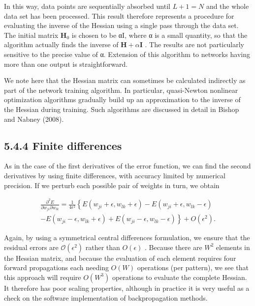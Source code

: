 \documentclass[
  10
]{article}
\begin{document}
In this way, data points are sequentially absorbed until \(L + 1 = N\)
and the whole data set has been processed. This result therefore
represents a procedure for evaluating the inverse of the Hessian using a
single pass through the data set. The initial matrix
\(\mathbf { H } _ { 0 }\) is chosen to be αI, where α is a small
quantity, so that the algorithm actually finds the inverse of
\(\mathbf H + \alpha \mathbf I\) . The results are not particularly
sensitive to the precise value of α. Extension of this algorithm to
networks having more than one output is straightforward.

We note here that the Hessian matrix can sometimes be calculated
indirectly as part of the network training algorithm. In particular,
quasi-Newton nonlinear optimization algorithms gradually build up an
approximation to the inverse of the Hessian during training. Such
algorithms are discussed in detail in Bishop and Nabney (2008).

\subsection{5.4.4 Finite differences}\label{finite-differences}

As in the case of the first derivatives of the error function, we can
find the second derivatives by using finite differences, with accuracy
limited by numerical precision. If we perturb each possible pair of
weights in turn, we obtain

\[
\begin{array}{c} \frac {\partial^ {2} E}{\partial w _ {j i} \partial w _ {l k}} = \frac {1}{4 \epsilon^ {2}} \left\{E (w _ {j i} + \epsilon , w _ {l k} + \epsilon) - E (w _ {j i} + \epsilon , w _ {l k} - \epsilon) \right. \\ \left. - E (w _ {j i} - \epsilon , w _ {l k} + \epsilon) + E (w _ {j i} - \epsilon , w _ {l k} - \epsilon) \right\} + O (\epsilon^ {2}). \end{array}\tag{5.90}
\]

Again, by using a symmetrical central differences formulation, we ensure
that the residual errors are \({ \mathcal O } ( \epsilon ^ { 2 } )\)
rather than \(O ( \epsilon )\) . Because there are \(W ^ { 2 }\)
elements in the Hessian matrix, and because the evaluation of each
element requires four forward propagations each needing \(O ( W )\)
operations (per pattern), we see that this approach will require
\(O ( W ^ { 3 } )\) operations to evaluate the complete Hessian. It
therefore has poor scaling properties, although in practice it is very
useful as a check on the software implementation of backpropagation
methods.
\end{document}
